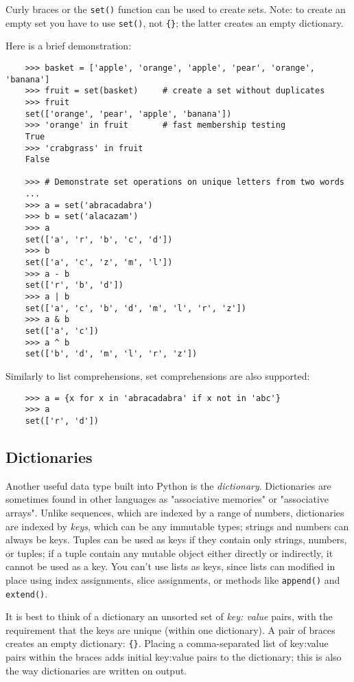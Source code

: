 \documentclass[UTF8]{article}
\begin{document}
Curly braces or the \texttt{set()} function can be used to create sets. Note: to create an empty
set you have to use \texttt{set()}, not \texttt{\{\}}; the latter creates an empty dictionary.

Here is a brief demonstration:
    \begin{verbatim}
    >>> basket = ['apple', 'orange', 'apple', 'pear', 'orange', 'banana']
    >>> fruit = set(basket)     # create a set without duplicates
    >>> fruit
    set(['orange', 'pear', 'apple', 'banana'])
    >>> 'orange' in fruit       # fast membership testing
    True
    >>> 'crabgrass' in fruit
    False

    >>> # Demonstrate set operations on unique letters from two words
    ...
    >>> a = set('abracadabra')
    >>> b = set('alacazam')
    >>> a
    set(['a', 'r', 'b', 'c', 'd'])
    >>> b
    set(['a', 'c', 'z', 'm', 'l'])
    >>> a - b
    set(['r', 'b', 'd'])
    >>> a | b
    set(['a', 'c', 'b', 'd', 'm', 'l', 'r', 'z'])
    >>> a & b
    set(['a', 'c'])
    >>> a ^ b
    set(['b', 'd', 'm', 'l', 'r', 'z'])
\end{verbatim}

Similarly to list comprehensions, set comprehensions are also supported:
\begin{verbatim}
    >>> a = {x for x in 'abracadabra' if x not in 'abc'}
    >>> a
    set(['r', 'd'])
\end{verbatim}

\subsection{Dictionaries}
Another useful data type built into Python is the \emph{dictionary}. Dictionaries are sometimes
found in other languages as "associative memories" or "associative arrays". Unlike sequences, which
are indexed by a range of numbers, dictionaries are indexed by \emph{keys}, which can be any
immutable types; strings and numbers can always be keys. Tuples can be used as keys if they contain
only strings, numbers, or tuples; if a tuple contain any mutable object either directly or
indirectly, it cannot be used as a key. You can't use lists as keys, since lists can modified in
place using index assignments, slice assignments, or methods like \texttt{append()} and
\texttt{extend()}.

It is best to think of a dictionary an unsorted set of \emph{key: value} pairs, with the
requirement that the keys are unique (within one dictionary). A pair of braces creates an empty
dictionary: \texttt{\{\}}. Placing a comma-separated list of key:value pairs within the braces adds
initial key:value pairs to the dictionary; this is also the way dictionaries are written on output.
\end{document}
